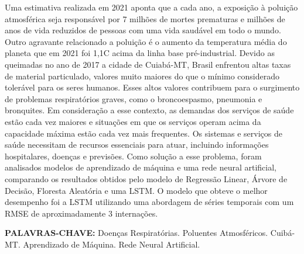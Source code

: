 \documentclass[
  12pt,		%
  a4paper,	%
  openright,%
  oneside,	%
  chapter=TITLE,		%
  section=TITLE,		%
  english,	%
  french,	%
  spanish,	%
  brazil	%
]{abntex2}
\begin{document}
    \begin{resumo}
    
    Uma estimativa realizada em 2021 aponta que a cada ano, a exposição à poluição atmosférica seja 
    responsável por 7 milhões de mortes prematuras e milhões de anos de vida reduzidos de pessoas 
    com uma vida saudável em todo o mundo. Outro agravante relacionado a poluição é o aumento da
    temperatura média do planeta que em 2021 foi 1,1\degree C acima da linha base pré-industrial.
    Devido as queimadas no ano de 2017 a cidade de Cuiabá-MT, Brasil enfrentou altas taxas de material particulado, valores
    muito maiores do que o mínimo considerado tolerável para os seres humanos. Esses altos valores
    contribuem para o surgimento de problemas respiratórios graves, como o
    broncoespasmo, pneumonia e bronquites.
    Em consideração a esse contexto, as demandas dos serviços de saúde estão cada vez maiores e situações em que os 
    serviços operam acima da capacidade máxima estão cada vez mais frequentes. Os sistemas e serviços de saúde necessitam 
    de recursos essenciais para atuar, incluindo informações hospitalares, doenças e previsões.
    Como solução a esse problema, foram analisados modelos de aprendizado de máquina e uma rede neural artificial, comparando
    os resultados obtidos pelo modelo de Regressão Linear, Árvore de Decisão, Floresta Aleatória e uma LSTM.
    O modelo que obteve o melhor desempenho foi a LSTM utilizando uma abordagem de séries temporais com um RMSE de aproximadamente
    3 internações.
        
        \vspace*{0.5cm}
    
        \noindent\textbf{\MakeUppercase{Palavras-Chave: }} Doenças Respiratórias. Poluentes Atmosféricos. Cuibá-MT.
        Aprendizado de Máquina. Rede Neural Artificial.
         
    
    \end{resumo}
    
    
\end{document}
